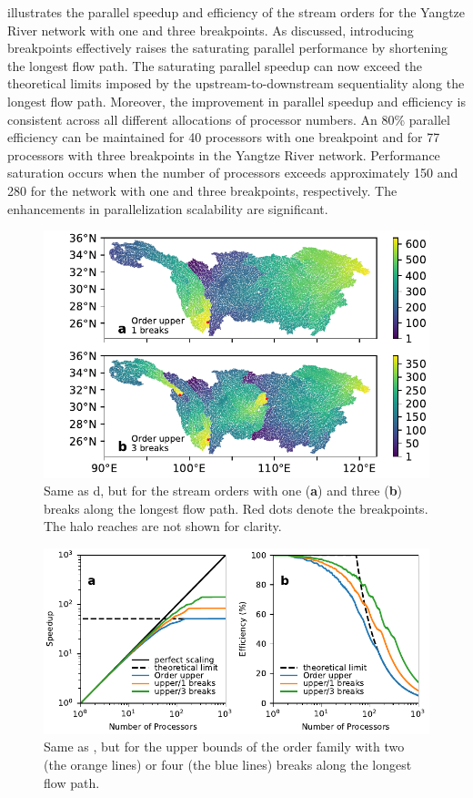 \documentclass[water,article,submit,pdftex,moreauthors]{Definitions/mdpi}
\begin{document}
 illustrates the parallel speedup and efficiency of the stream orders for the Yangtze River network with one and three breakpoints. As discussed, introducing breakpoints effectively raises the saturating parallel performance by shortening the longest flow path. The saturating parallel speedup can now exceed the theoretical limits imposed by the upstream-to-downstream sequentiality along the longest flow path. Moreover, the improvement in parallel speedup and efficiency is consistent across all different allocations of processor numbers. An 80\% parallel efficiency can be maintained for 40 processors with one breakpoint and for 77 processors with three breakpoints in the Yangtze River network. Performance saturation occurs when the number of processors exceeds approximately 150 and 280 for the network with one and three breakpoints, respectively. The enhancements in parallelization scalability are significant.

\begin{figure}[H]
	\includegraphics[width=10.5 cm]{fig/spatial_distribution_breakdown_yangtze.pdf}
	\caption{Same as d, but for the stream orders with one (\textbf{a}) and three (\textbf{b}) breaks along the longest flow path. Red dots denote the breakpoints. The halo reaches are not shown for clarity. \label{fig:spatial_distribution_breakdown_yangtze}}
\end{figure}

\begin{figure}[H]
	\includegraphics[width=13.5cm]{fig/speedup_bd_yangtze.pdf}
	\caption{Same as , but for the upper bounds of the order family with two (the orange lines) or four (the blue lines) breaks along the longest flow path. \label{fig:scalability_breakdown_yangtze}}
\end{figure}
\end{document}
